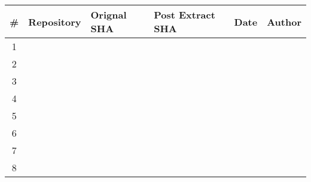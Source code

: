 \newpage
\begin{table}[ht]
    \centering
    \begin{tabular}{c|lllll}
    \hline
    \multicolumn{1}{|c|}{\#} & \multicolumn{1}{l|}{\textbf{Repository}} & \multicolumn{1}{l|}{\textbf{Orignal SHA}} & \multicolumn{1}{l|}{\textbf{Post Extract SHA}} & \multicolumn{1}{l|}{\textbf{Date}} & \multicolumn{1}{l|}{\textbf{Author}} \\ \hline
    1                        &                                          & \textbf{}                                 &                                                &                                    &                                      \\
    2                        &                                          &                                           &                                                &                                    &                                      \\
    3                        &                                          &                                           &                                                &                                    &                                      \\
    4                        &                                          &                                           &                                                &                                    &                                      \\
    5                        &                                          &                                           &                                                &                                    &                                      \\
    6                        &                                          &                                           &                                                &                                    &                                      \\
    7                        &                                          &                                           &                                                &                                    &                                      \\
    8                        &                                          &                                           &                                                &                                    &                                      \\

\end{tabular}
\end{table}
